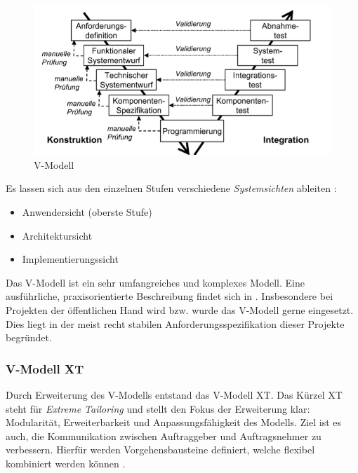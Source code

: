 \begin{figure}
  \centering
  \includegraphics[width=\textwidth]{img/vmodell.png}
  \caption{V-Modell \parencite[][S. 31]{Kleuker:2011aa}}
  \label{fig:vmodell}
\end{figure}

Es lassen sich aus den einzelnen Stufen verschiedene \emph{Systemsichten} ableiten \parencite[vgl.][S. 50]{Schatten:2010aa}: 

\begin{itemize}
\item Anwendersicht (oberste Stufe)
\item Architektursicht 
\item Implementierungssicht
\end{itemize}

Das V-Modell ist ein sehr umfangreiches und komplexes Modell.
Eine ausführliche, praxisorientierte Beschreibung findet sich in \parencite[][]{brohl1993v}.
Insbesondere bei Projekten der öffentlichen Hand wird bzw. wurde das V-Modell gerne eingesetzt.
Dies liegt in der meist recht stabilen Anforderungsspezifikation dieser Projekte begründet.
\parencite[Vgl.][S. 52]{Schatten:2010aa}

\subsubsection{V-Modell XT}

Durch Erweiterung des V-Modells entstand das V-Modell XT.
Das Kürzel XT steht für \emph{Extreme Tailoring} und stellt den Fokus der Erweiterung klar: Modularität, Erweiterbarkeit und Anpassungsfähigkeit des Modells.
Ziel ist es auch, die Kommunikation zwischen Auftraggeber und Auftragsnehmer zu verbessern.
Hierfür werden Vorgehensbausteine definiert, welche flexibel kombiniert werden können \parencite[vgl.][S. 222]{Broy:2005aa}.


